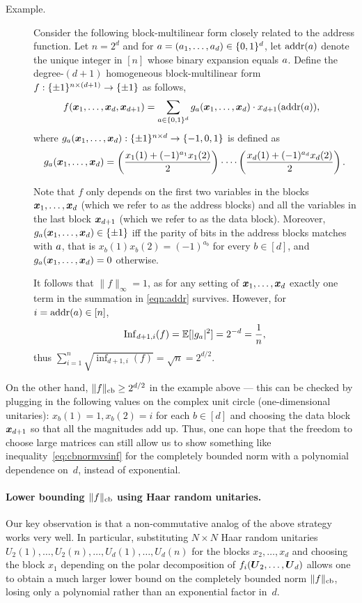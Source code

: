 \begin{description}\item[Example.] Consider the following block-multilinear form closely related to the address function. Let $n=2^d$ and for ${{a}} = (a_1, \ldots, a_d) \in \{0,1\}^d$, let $\mathrm{addr}({{a}})$ denote the unique integer in $[n]$ whose binary expansion equals ${{a}}$. Define the degree-$(d+1)$ homogeneous block-multilinear form $f: \{\pm 1\}^{n \times (d+1)} \to \{\pm1\}$ as follows,
\begin{align}\label{eqn:addr}
    \ f(\boldsymbol{x}_1, \ldots, \boldsymbol{x}_d, \boldsymbol{x}_{d+1}) &= \sum_{{{a}} \in \{0,1\}^d} g_{{{a}}}(\boldsymbol{x}_1,\ldots,\boldsymbol{x}_d) \cdot x_{d+1}(\mathrm{addr}({{a}})),
\end{align}
where $g_{{{a}}}(\boldsymbol{x}_1,\ldots, \boldsymbol{x}_d): \{\pm 1\}^{n \times d} \to \{-1,0,1\}$ is defined as 
\[ g_{{{a}}}(\boldsymbol{x}_1,\ldots, \boldsymbol{x}_d) = \left(\frac{x_1(1) + (-1)^{a_1} x_1(2)}{2}\right)\cdot \cdots \left(\frac{x_d(1) + (-1)^{a_d} x_d(2)}{2}\right).\]

Note that $f$ only depends on the first two variables in the blocks $\boldsymbol{x}_1,\ldots, \boldsymbol{x}_d$ (which we refer to as the address blocks) and all the variables in the last block $\boldsymbol{x}_{d+1}$ (which we refer to as the data block). Moreover, $g_{{a}}(\boldsymbol{x}_1,\ldots,\boldsymbol{x}_d) \in \{\pm 1\}$ iff the parity of bits in the address blocks matches with ${{a}}$, that is $x_b(1)x_b(2) = (-1)^{a_b}$ for every $b \in [d]$, and $g_{{a}}(\boldsymbol{x}_1,\ldots,\boldsymbol{x}_d) = 0$ otherwise. 

 It follows that $\|f\|_{\infty} = 1$, as for any setting of $\boldsymbol{x}_1, \ldots, \boldsymbol{x}_d$ exactly one term in the summation in \eqref{eqn:addr} survives. However, for $i = \mathrm{addr}({{a}}) \in [n]$, 
\[ \mathrm{Inf}_{d+1,i}(f) = \mathbb{E}[|g_a|^2] = 2^{-d} = \frac1n,\] 
thus  $\sum_{i=1}^n \sqrt{\inf_{d+1,i}(f)} = \sqrt{n} = 2^{d/2}$. 
\end{description}

On the other hand, $\|f\|_{\mathrm{cb}} \ge 2^{d/2}$ in the example above --- this can be checked by plugging in the following values on the complex unit circle (one-dimensional unitaries): $x_b(1)=1,x_b(2)=i$ for each $b \in [d]$ and choosing the data block $\boldsymbol{x}_{d+1}$ so that all the magnitudes add up. Thus, one can hope that the freedom to choose large matrices can still allow us to show something like inequality~\eqref{eq:cbnormvsinf} for the completely bounded norm with a polynomial dependence on~$d$, instead of exponential.

\paragraph{Lower bounding $\|f\|_{\mathrm{cb}}$ using Haar random unitaries.} 
\begin{sloppypar}
Our key observation is that a non-commutative analog of the above strategy works very well. In particular, substituting $N \times N$ Haar random unitaries $U_2(1), \ldots, U_2(n), \ldots, U_d(1),\ldots, U_d(n)$ for the blocks $x_2, \ldots, x_d$ and choosing the block $x_1$ depending on the polar decomposition of $f_i(\boldsymbol{U}_2, \ldots, \boldsymbol{U}_d)$ allows one to obtain a much larger lower bound on the completely bounded norm $\|f\|_{\mathrm{cb}}$, losing only a polynomial rather than an exponential factor in~$d$. 
\end{sloppypar}

